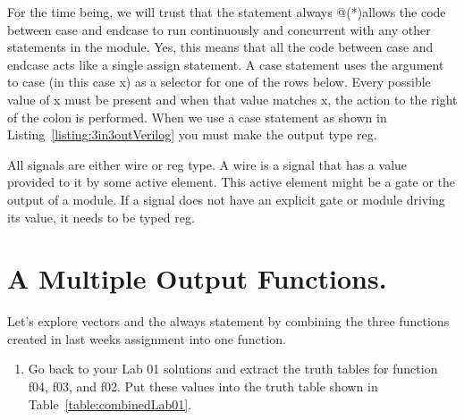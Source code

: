 For the time being, we will trust that the statement always @(*)allows
the code between case and endcase to run continuously and concurrent
with any other statements in the module. Yes, this means that all the
code between case and endcase acts like a single assign statement. A
case statement uses the argument to case (in this case x) as a selector
for one of the rows below. Every possible value of x must be present and
when that value matches x, the action to the right of the colon is
performed. When we use a case statement as shown in Listing~\ref{listing:3in3outVerilog} 
you must make the output type reg.

All signals are either wire or reg type. A wire is a signal that has a
value provided to it by some active element. This active element might
be a gate or the output of a module. If a signal does not have an
explicit gate or module driving its value, it needs to be typed reg.

\hypertarget{part-1-combine-lab-1-functions.}{%
\section{A Multiple Output Functions.}\label{part-1-combine-lab-1-functions.}}

Let's explore vectors and the always statement by combining the three
functions created in last weeks assignment into one function.

\begin{enumerate}
\def\labelenumi{\arabic{enumi}.}
\item
  Go back to your Lab 01 solutions and extract the truth tables for
  function f04, f03, and f02. Put these values into the truth table
  shown in Table~\ref{table:combinedLab01}.
\end{enumerate}

